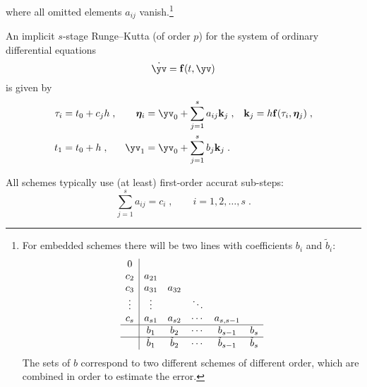 \documentclass[\mydriver,12pt,twoside,notitlepage]{article}
\newcommand{\etav}    {\bm{\eta}}
\newcommand{\fv}      {\mathbf{f}}
\newcommand{\kv}      {\mathbf{k}}
\begin{document}
where all omitted elements $a_{ij}$ vanish.\footnote{
  For embedded schemes there will be two lines with
  coefficients $b_i$ and $\tilde{b}_i$:
  \begin{equation}
    \begin{array}{c|ccccc}
      0                                                 \\
      c_2    & a_{21}                                   \\
      c_3    & a_{31} & a_{32}                          \\
      \vdots & \vdots &        & \ddots &               \\
      c_s    & a_{s1} & a_{s2} & \cdots & a_{s,s-1}     \\
      \hline
             & b_1    & b_2    & \cdots & b_{s-1} & b_s \\
      \hline
             & \tilde{b}_1
                      & \tilde{b}_2
                               & \cdots
                                        & \tilde{b}_{s-1}
                                                  & \tilde{b}_s
    \end{array}
  \end{equation}
  The sets of $b$ correspond to two different schemes of different order,
  which are combined in order to estimate the error.
}


An implicit $s$-stage Runge--Kutta (of order $p$) for the system of
ordinary differential equations
\begin{equation}
  \dot{\yv} = \fv(t,\yv)
\end{equation}
is given by
\begin{align}
  \tau_i  &= t_0 + c_j h \; ,
             & \etav_i &= \yv_0 + \sum\limits_{j=1}^{s} a_{ij} \kv_j \; ,
                          & \kv_j &= h\fv(\tau_i, \etav_j) \; ,\\
  t_1     &= t_0 + h \; ,
             & \yv_1   &= \yv_0 + \sum\limits_{j=1}^{s} b_j \kv_j \; .
\end{align}

All schemes typically use (at least) first-order accurat sub-steps:
\begin{equation}
  \sum\limits_{j=1}^{s} a_{ij} = c_i \; , \qquad i=1,2,\ldots,s \; .
\end{equation}
\end{document}

